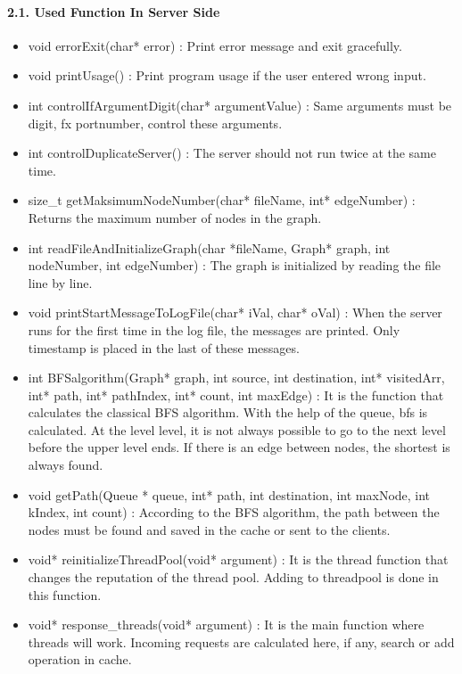 \documentclass[a4paper,12pt]{report}
\begin{document}
\paragraph{2.1. Used Function In Server Side\newline}
\begin{itemize}
    \item void errorExit(char* error) : Print error message and exit gracefully.
    \item void printUsage() : Print program usage if the user entered wrong input.
    \item int controlIfArgumentDigit(char* argumentValue) : Same arguments must be digit, fx portnumber, control these arguments.
    \item int controlDuplicateServer() : The server should not run twice at the same time.
    \item size\_t getMaksimumNodeNumber(char* fileName, int* edgeNumber) : Returns the maximum number of nodes in the graph.
    \item int readFileAndInitializeGraph(char *fileName, Graph* graph, int nodeNumber, int edgeNumber) : The graph is initialized by reading the file line by line.
    \item void printStartMessageToLogFile(char* iVal, char* oVal) : When the server runs for the first time in the log file, the messages are printed. Only timestamp is placed in the last of these messages.
    \item int BFSalgorithm(Graph* graph, int source, int destination, int* visitedArr, int* path, int* pathIndex, int* count, int maxEdge) : It is the function that calculates the classical BFS algorithm. With the help of the queue, bfs is calculated. At the level level, it is not always possible to go to the next level before the upper level ends. If there is an edge between nodes, the shortest is always found.
    \item void getPath(Queue * queue, int* path, int destination, int maxNode, int kIndex, int count) : According to the BFS algorithm, the path between the nodes must be found and saved in the cache or sent to the clients.
    \item void* reinitializeThreadPool(void* argument) : It is the thread function that changes the reputation of the thread pool. Adding to threadpool is done in this function.
    \item void* response\_threads(void* argument) : It is the main function where threads will work. Incoming requests are calculated here, if any, search or add operation in cache.

\end{itemize}
\end{document}
